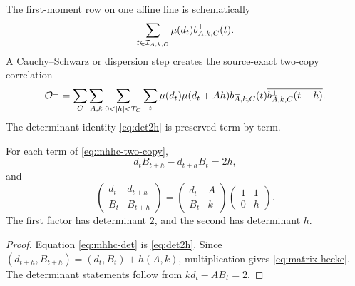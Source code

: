 The first-moment row on one affine line is schematically
\begin{equation}\label{eq:first-moment-row}
        \sum_{t\in\mathcal I_{A,k,C}}\mu(d_t)b^\perp_{A,k,C}(t).
\end{equation}
A Cauchy--Schwarz or dispersion step creates the source-exact two-copy
correlation
\begin{equation}\label{eq:mhhc-two-copy}
 \cO^\perp=
 \sum_{C}\sum_{A,k}\sum_{0<|h|<T_C}\sum_t
 \mu(d_t)\mu(d_t+Ah)
 b^\perp_{A,k,C}(t)\overline{b^\perp_{A,k,C}(t+h)}.
\end{equation}
The determinant identity \cref{eq:det2h} is preserved term by term.

\begin{proposition}\label{prop:mhhc-geometry}
For each term of \cref{eq:mhhc-two-copy},
\begin{equation}\label{eq:mhhc-det}
 d_tB_{t+h}-d_{t+h}B_t=2h,
\end{equation}
and
\begin{equation}\label{eq:matrix-hecke}
 \begin{pmatrix}d_t&d_{t+h}\\B_t&B_{t+h}\end{pmatrix}
 =
 \begin{pmatrix}d_t&A\\B_t&k\end{pmatrix}
 \begin{pmatrix}1&1\\0&h\end{pmatrix}.
\end{equation}
The first factor has determinant $2$, and the second has determinant $h$.
\end{proposition}

\begin{proof}
Equation \cref{eq:mhhc-det} is \cref{eq:det2h}.  Since
$(d_{t+h},B_{t+h})=(d_t,B_t)+h(A,k)$, multiplication gives
\cref{eq:matrix-hecke}.  The determinant statements follow from
$kd_t-AB_t=2$.
\end{proof}

